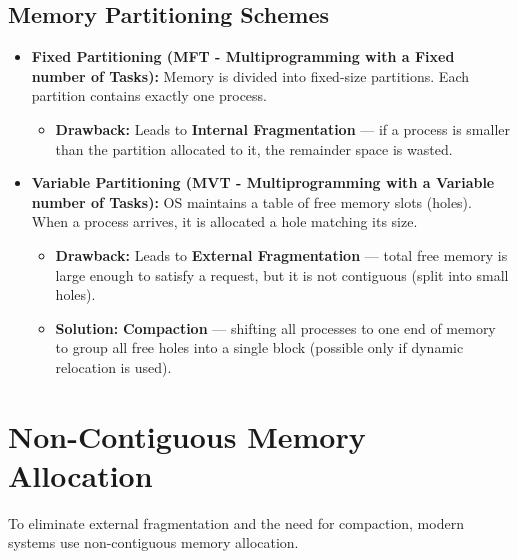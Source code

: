 \documentclass[12pt,a4paper]{article}
\begin{document}
\subsection{Memory Partitioning Schemes}
\begin{itemize}[leftmargin=*, itemsep=3pt]
  \item \textbf{Fixed Partitioning (MFT - Multiprogramming with a Fixed number of Tasks):} Memory is divided into fixed-size partitions. Each partition contains exactly one process.
  \begin{itemize}[leftmargin=*, itemsep=2.5pt, topsep=0pt]
    \item \textbf{Drawback:} Leads to \textbf{Internal Fragmentation} --- if a process is smaller than the partition allocated to it, the remainder space is wasted.
  \end{itemize}
  \item \textbf{Variable Partitioning (MVT - Multiprogramming with a Variable number of Tasks):} OS maintains a table of free memory slots (holes). When a process arrives, it is allocated a hole matching its size.
  \begin{itemize}[leftmargin=*, itemsep=2.5pt, topsep=0pt]
    \item \textbf{Drawback:} Leads to \textbf{External Fragmentation} --- total free memory is large enough to satisfy a request, but it is not contiguous (split into small holes).
    \item \textbf{Solution:} \textbf{Compaction} --- shifting all processes to one end of memory to group all free holes into a single block (possible only if dynamic relocation is used).
    \end{itemize}
  \end{itemize}

\section{Non-Contiguous Memory Allocation}

To eliminate external fragmentation and the need for compaction, modern systems use non-contiguous memory allocation.
\end{document}
